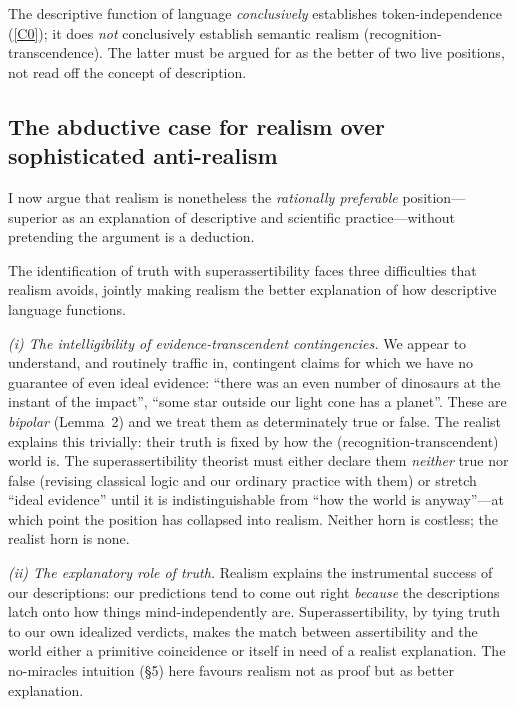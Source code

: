 \documentclass[12pt]{article}
\begin{document}
\begin{description}[leftmargin=1.6em,style=nextline]
\item[Honest interim verdict.] The descriptive function of language
\emph{conclusively} establishes token-independence (\ref{C0}); it does
\emph{not} conclusively establish semantic realism (recognition-trans\-cen\-dence).
The latter must be argued for as the better of two live positions, not
read off the concept of description.
\end{description}

\subsection{The abductive case for realism over sophisticated anti-realism}

I now argue that realism is nonetheless the \emph{rationally preferable}
position---superior as an explanation of descriptive and scientific
practice---without pretending the argument is a deduction.

\begin{description}[leftmargin=1.6em,style=nextline]
\item[Lemma 3$'$ (The pressure on superassertibility).] The
identification of truth with superassertibility faces three difficulties
that realism avoids, jointly making realism the better explanation of how
descriptive language functions.
\end{description}

\noindent\emph{(i) The intelligibility of evidence-transcendent
contingencies.} We appear to understand, and routinely traffic in,
contingent claims for which we have no guarantee of even ideal evidence:
``there was an even number of dinosaurs at the instant of the impact'',
``some star outside our light cone has a planet''. These are
\emph{bipolar} (Lemma~2) and we treat them as determinately true or
false. The realist explains this trivially: their truth is fixed by how
the (recognition-transcendent) world is. The superassertibility theorist
must either declare them \emph{neither} true nor false (revising classical
logic and our ordinary practice with them) or stretch ``ideal evidence''
until it is indistinguishable from ``how the world is anyway''---at which
point the position has collapsed into realism. Neither horn is costless;
the realist horn is none.

\noindent\emph{(ii) The explanatory role of truth.} Realism explains the
instrumental success of our descriptions: our predictions tend to come
out right \emph{because} the descriptions latch onto how things mind-inde\-pen\-dently
are. Superassertibility, by tying truth to our own idealized verdicts,
makes the match between assertibility and the world either a primitive
coincidence or itself in need of a realist explanation. The
no-miracles intuition (\S5) here favours realism not as proof but as
better explanation.
\end{document}
